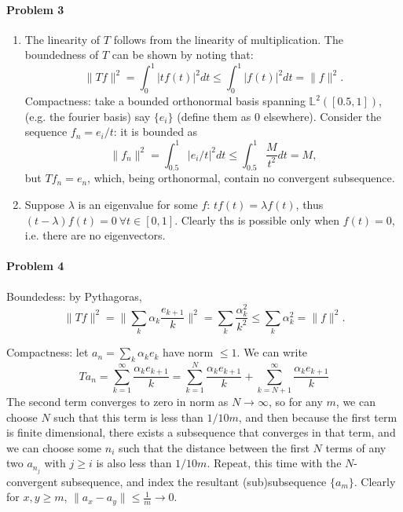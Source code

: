 \documentclass[12pt]{article}
\begin{document}
\paragraph{Problem 3}
\begin{enumerate}[label=\alph*)]
\item The linearity of $T$ follows from the linearity of multiplication. The
  boundedness of $T$ can be shown by noting that:
  \begin{displaymath}
    \|Tf\|^2 = \int_0^1|tf(t)|^2dt \leq \int_0^1|f(t)|^2dt = \|f\|^2.
  \end{displaymath}
  Compactness: take a bounded orthonormal basis spanning $\mathbb{L}^2([0.5,1])$,
  (e.g. the fourier basis) say
  $\{e_i\}$ (define them as 0 elsewhere). Consider the sequence $f_n = e_i/t$:
  it is bounded as
  \begin{displaymath}
    \|f_n\|^2 = \int_{0.5}^1|e_i/t|^2dt\leq \int_{0.5}^1\frac{M}{t^2}dt = M,
  \end{displaymath}
  but $Tf_n = e_n$, which, being orthonormal, contain no convergent subsequence.
\item Suppose $\lambda$ is an eigenvalue for some $f$: $tf(t) = \lambda f(t)$,
  thus $(t-\lambda)f(t) = 0\ \forall t \in [0,1]$. Clearly ths is possible only
  when $f(t) = 0$, i.e. there are no eigenvectors.
\end{enumerate}

\paragraph{Problem 4}

Boundedess: by Pythagoras,
\begin{displaymath}
  \|Tf\|^2 = \|\sum_k\alpha_k\frac{e_{k+1}}{k}\|^2 = \sum_k\frac{\alpha^2_k}{k^2}
  \leq \sum_k \alpha^2_k = \|f\|^2.
\end{displaymath}

Compactness: let $a_n=\sum_k\alpha_ke_k$ have norm $\leq 1$. We can write
\begin{displaymath}
  Ta_n = \sum_{k=1}^\infty\frac{\alpha_ke_{k+1}}{k} = 
  \sum_{k=1}^N\frac{\alpha_ke_{k+1}}{k} + \sum_{k=N+1}^\infty \frac{\alpha_ke_{k+1}}
  {k}
\end{displaymath}
The second term converges to zero in norm as $N \to \infty$, so for any $m$, we can
choose $N$ such that this term is less than $1/{10m}$, and then because the
first term is finite dimensional, there exists a subsequence that converges
in that term, and we can choose some $n_i$ such that the distance
between the first $N$ terms of any two $a_{n_j}$ with $j\geq i$ is also less than
$1/{10m}$. Repeat, this time with the $N$-convergent subsequence, and index
the resultant (sub)subsequence $\{a_m\}$. Clearly for $x, y \geq m$, $\|a_x
- a_y\| \leq \frac{1}{m} \to 0$.
\end{document}
